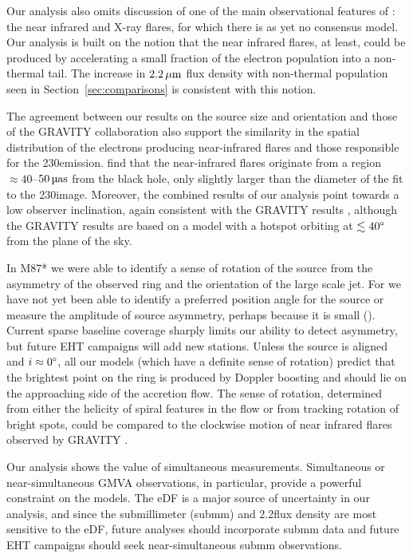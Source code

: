 Our analysis also omits discussion of one of the main observational features of \sgra: the near infrared and X-ray flares, for which there is as yet no consensus model.
Our analysis is built on the notion that the near infrared flares, at least, could be produced by accelerating a small fraction of the electron population into a non-thermal tail.
The increase in $2.2\,\mu\mathrm{m}$ flux density with non-thermal population seen in Section~\ref{sec:comparisons} is consistent with this notion.

The agreement between our results on the source size and orientation and those of the GRAVITY collaboration \citep{2018A&A...618L..10G} also support the similarity in the spatial distribution of the electrons producing near-infrared flares and those responsible for the 230\GHz emission.
\citealt{2018A&A...618L..10G} find that the near-infrared flares originate from a region $\approx 40$--$50\uas$ from the black hole, only slightly larger than the diameter of the \mring fit to the 230\GHz image.
Moreover, the combined results of our analysis point towards a low observer inclination, again consistent with the GRAVITY results , although the GRAVITY results are based on a model with a hotspot orbiting at $\lesssim 40\degree$ from the plane of the sky.

In M87* we were able to identify a sense of rotation of the source from the asymmetry of the observed ring and the orientation of the large scale jet.
For \sgra we have not yet been able to identify a preferred position angle for the source or measure the amplitude of source asymmetry, perhaps because it is small ().
Current sparse baseline coverage sharply limits our ability to detect asymmetry, but future EHT campaigns will add new stations.
Unless the source is aligned and $i \approx 0\degree$, all our models (which have a definite sense of rotation) predict that the brightest point on the ring is produced by Doppler boosting and should lie on the approaching side of the accretion flow.  The sense of rotation, determined from either the helicity of spiral features in the flow or from tracking rotation of bright spots, could be compared to the clockwise motion of near infrared flares observed by GRAVITY \citep{2018A&A...618L..10G}.

Our analysis shows the value of simultaneous measurements.
Simultaneous or near-simultaneous GMVA observations, in particular, provide a powerful constraint on the models.
The eDF is a major source of uncertainty in our analysis, and since the submillimeter (submm) and 2.2\um flux density are most sensitive to the eDF, future analyses should incorporate submm data and future EHT campaigns should seek near-simultaneous submm observations.

